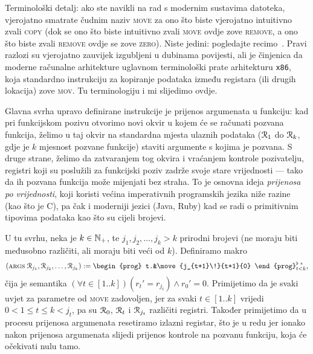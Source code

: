 \begin{napomena}[{name=[{terminologija makroa za kopiranje, premještanje i brisanje}]}]
Terminološki detalj: ako ste navikli na rad s modernim sustavima datoteka, vjerojatno smatrate čudnim naziv \textsc{move} za ono što biste vjerojatno intuitivno zvali \textsc{copy} (dok se ono što biste intuitivno zvali \textsc{move} ovdje zove \textsc{remove}, a ono što biste zvali \textsc{remove} ovdje se zove \textsc{zero}). Niste jedini: pogledajte recimo~\cite{url:movecopy}. Pravi razlozi su vjerojatno zauvijek izgubljeni u dubinama povijesti, ali je činjenica da moderne računalne arhitekture uglavnom terminološki prate arhitekturu \texttt{x86}, koja standardno instrukciju za kopiranje podataka između registara (ili drugih lokacija) zove \textsc{mov}. Tu terminologiju i mi slijedimo ovdje.
\end{napomena}

Glavna svrha upravo definirane instrukcije je prijenos argumenata u funkciju: kad pri funkcijskom pozivu otvorimo novi okvir u kojem će se računati pozvana funkcija, želimo u taj okvir na standardna mjesta ulaznih podataka ($\mathcal R_{1}$ do $\mathcal R_{k}$, gdje je $k$ mjesnost pozvane funkcije) staviti argumente s kojima je pozvana. S druge strane, želimo da zatvaranjem tog okvira i vraćanjem kontrole pozivatelju, registri koji su poslužili za funkcijski poziv zadrže svoje stare vrijednosti --- tako da ih pozvana funkcija može mijenjati bez straha. To je osnovna ideja \emph{prijenosa po vrijednosti}, koji koristi većina imperativnih programskih jezika niže razine (kao što je C), pa čak i moderniji jezici (Java, Ruby) kad se radi o primitivnim tipovima podataka kao što su cijeli brojevi.

U tu svrhu, neka je $k\in{\mathbb N}_+$, te $j_1,j_2,\dotsc,j_k>k$ prirodni brojevi (ne moraju biti međusobno različiti, ali moraju biti veći od $k$). Definiramo makro
\begin{equation}
    (\textsc{args} \;\reg{j_1},\reg{j_2},\dotsc,\reg{j_k}):=\begin{prog} t.&\move{j_{t+1}\!}{t+1}{0}
    \end{prog}^{\flat\;*}_{t<k}\text,
\end{equation}
čija je semantika $(\forall t\in[1..k])(r_t'=r_{j_t})\land r_0'=0$. Primijetimo da je svaki uvjet za parametre od \textsc{move} zadovoljen, jer za svaki $t\in[1..k]$ vrijedi $0<1\le t\le k<j_t$, pa su $\mathcal R_{0}$, $\mathcal R_{t}$ i $\mathcal R_{j_t}$ različiti registri. Također primijetimo da u procesu prijenosa argumenata resetiramo izlazni registar, što je u redu jer ionako nakon prijenosa argumenata slijedi prijenos kontrole na pozvanu funkciju, koja će očekivati nulu tamo.

